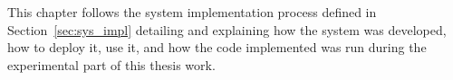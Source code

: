 This chapter follows the system implementation process defined in Section~\ref{sec:sys_impl} detailing and explaining how the system was developed, how to deploy it, use it, and how the code implemented was run during the experimental part of this thesis work.